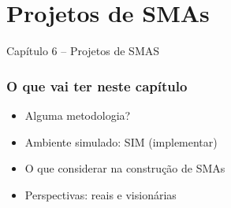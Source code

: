 


\section{Projetos de SMAs}

\begin{frame}

\begin{center}
{\huge Capítulo 6 -- Projetos de SMAS}
\end{center}

\end{frame}


\begin{frame} %


\frametitle{O que vai ter neste capítulo}

\begin{itemize}
  \item Alguma metodologia?
  \item Ambiente simulado: SIM (implementar)
  
  \item O que considerar na construção de SMAs
  \item Perspectivas: reais e visionárias
\end{itemize}


\end{frame}



